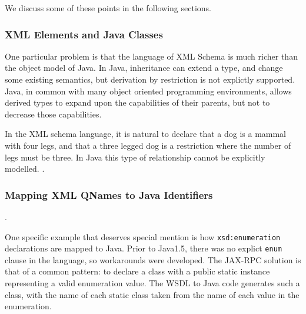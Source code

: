We discuss some of these points in the following sections.

\subsubsection{XML Elements and Java Classes}
\label{objections:o-x:xml-classes}

One particular problem is that the language of XML Schema is much
richer than the object model of Java. In Java, inheritance can extend
a type, and change some existing semantics, but derivation by
restriction is not explictly supported. Java, in common with many
object oriented programming environments, allows derived types to
expand upon the capabilities of their parents, but not to decrease
those capabilities.

In the XML schema language, it is natural to declare that a dog is a
mammal with four legs, and that a three legged dog is a restriction
where the number of legs must be three. In Java this type of
relationship cannot be explicitly modelled. .


\subsubsection{Mapping XML QNames to Java Identifiers}
\label{objections:o-x:names}

.

One specific example that deserves special mention is how
\verb$xsd:enumeration$ declarations are mapped to Java. Prior to
Java1.5, there was no explict \verb$enum$ clause in the language, so
workarounds were developed. The JAX-RPC solution is that of a common
pattern: to declare a class with a public static instance representing
a valid enumeration value. The WSDL to Java code generates such a
class, with the name of each static class taken from the name of each
value in the enumeration.

